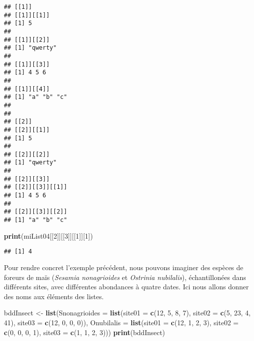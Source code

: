 \documentclass[]{book}
\newenvironment{Shaded}{\begin{snugshade}}{\end{snugshade}}
\newcommand{\KeywordTok}[1]{\textcolor[rgb]{0.13,0.29,0.53}{\textbf{#1}}}
\newcommand{\DataTypeTok}[1]{\textcolor[rgb]{0.13,0.29,0.53}{#1}}
\newcommand{\DecValTok}[1]{\textcolor[rgb]{0.00,0.00,0.81}{#1}}
\newcommand{\StringTok}[1]{\textcolor[rgb]{0.31,0.60,0.02}{#1}}
\newcommand{\NormalTok}[1]{#1}
\theoremstyle{definition}
\theoremstyle{definition}
\theoremstyle{definition}
\theoremstyle{remark}
\begin{document}
\begin{verbatim}
## [[1]]
## [[1]][[1]]
## [1] 5
## 
## [[1]][[2]]
## [1] "qwerty"
## 
## [[1]][[3]]
## [1] 4 5 6
## 
## [[1]][[4]]
## [1] "a" "b" "c"
## 
## 
## [[2]]
## [[2]][[1]]
## [1] 5
## 
## [[2]][[2]]
## [1] "qwerty"
## 
## [[2]][[3]]
## [[2]][[3]][[1]]
## [1] 4 5 6
## 
## [[2]][[3]][[2]]
## [1] "a" "b" "c"
\end{verbatim}

\begin{Shaded}
\begin{Highlighting}[]
\KeywordTok{print}\NormalTok{(miList04[[}\DecValTok{2}\NormalTok{]][[}\DecValTok{3}\NormalTok{]][[}\DecValTok{1}\NormalTok{]][}\DecValTok{1}\NormalTok{])}
\end{Highlighting}
\end{Shaded}

\begin{verbatim}
## [1] 4
\end{verbatim}

Pour rendre concret l'exemple précédent, nous pouvons imaginer des
espèces de foreurs de maïs (\emph{Sesamia nonagrioides} et
\emph{Ostrinia nubilalis}), échantillonées dans différents sites, avec
différentes abondances à quatre dates. Ici nous allons donner des noms
aux éléments des listes.

\begin{Shaded}
\begin{Highlighting}[]
\NormalTok{bddInsect <-}\StringTok{ }\KeywordTok{list}\NormalTok{(}\DataTypeTok{Snonagrioides =} \KeywordTok{list}\NormalTok{(}\DataTypeTok{site01 =} \KeywordTok{c}\NormalTok{(}\DecValTok{12}\NormalTok{, }\DecValTok{5}\NormalTok{, }\DecValTok{8}\NormalTok{, }\DecValTok{7}\NormalTok{), }\DataTypeTok{site02 =} \KeywordTok{c}\NormalTok{(}\DecValTok{5}\NormalTok{, }\DecValTok{23}\NormalTok{, }\DecValTok{4}\NormalTok{, }\DecValTok{41}\NormalTok{), }\DataTypeTok{site03 =} \KeywordTok{c}\NormalTok{(}\DecValTok{12}\NormalTok{, }\DecValTok{0}\NormalTok{, }\DecValTok{0}\NormalTok{, }\DecValTok{0}\NormalTok{)), }\DataTypeTok{Onubilalis =} \KeywordTok{list}\NormalTok{(}\DataTypeTok{site01 =} \KeywordTok{c}\NormalTok{(}\DecValTok{12}\NormalTok{, }\DecValTok{1}\NormalTok{, }\DecValTok{2}\NormalTok{, }\DecValTok{3}\NormalTok{), }\DataTypeTok{site02 =} \KeywordTok{c}\NormalTok{(}\DecValTok{0}\NormalTok{, }\DecValTok{0}\NormalTok{, }\DecValTok{0}\NormalTok{, }\DecValTok{1}\NormalTok{), }\DataTypeTok{site03 =} \KeywordTok{c}\NormalTok{(}\DecValTok{1}\NormalTok{, }\DecValTok{1}\NormalTok{, }\DecValTok{2}\NormalTok{, }\DecValTok{3}\NormalTok{)))}
\KeywordTok{print}\NormalTok{(bddInsect)}
\end{Highlighting}
\end{Shaded}
\end{document}
